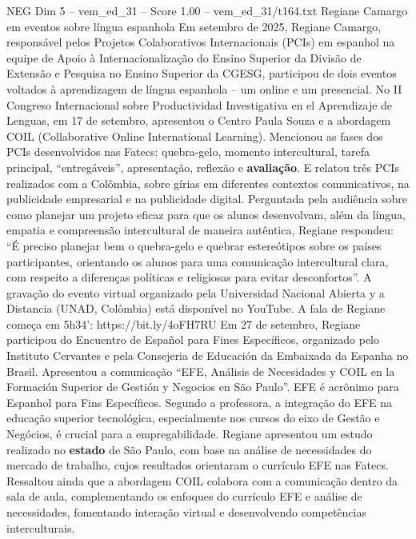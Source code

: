 \begin{textsample}{NEG Dim 5 – vem\_ed\_31 – Score 1.00 – vem\_ed\_31/t164.txt}  \label{ex:f5_neg_120}
Regiane Camargo em eventos sobre língua espanhola Em setembro de 2025, Regiane Camargo, responsável pelos Projetos Colaborativos Internacionais (PCIs) em espanhol na equipe de Apoio à Internacionalização do Ensino Superior da Divisão de Extensão e Pesquisa no Ensino Superior da CGESG, participou de dois eventos voltados à aprendizagem de língua espanhola – um online e um presencial.
No II Congreso Internacional sobre Productividad Investigativa en el Aprendizaje de Lenguas, em 17 de setembro, apresentou o Centro Paula Souza e a abordagem COIL (Collaborative Online International Learning).
Mencionou as fases dos PCIs desenvolvidos nas Fatecs: quebra-gelo, momento intercultural, tarefa principal, “entregáveis”, apresentação, reflexão e \textbf{avaliação}.
E relatou três PCIs realizados com a Colômbia, sobre gírias em diferentes contextos comunicativos, na publicidade empresarial e na publicidade digital.
Perguntada pela audiência sobre como planejar um projeto eficaz para que os alunos desenvolvam, além da língua, empatia e compreensão intercultural de maneira autêntica, Regiane respondeu: “É preciso planejar bem o quebra-gelo e quebrar estereótipos sobre os países participantes, orientando os alunos para uma comunicação intercultural clara, com respeito a diferenças políticas e religiosas para evitar desconfortos”.
A gravação do evento virtual organizado pela Universidad Nacional Abierta y a Distancia (UNAD, Colômbia) está disponível no YouTube.
A fala de Regiane começa em 5h34’: https://bit.ly/4oFH7RU Em 27 de setembro, Regiane participou do Encuentro de Español para Fines Específicos, organizado pelo Instituto Cervantes e pela Consejeria de Educación da Embaixada da Espanha no Brasil.
Apresentou a comunicação “EFE, Análisis de Necesidades y COIL en la Formación Superior de Gestión y Negocios en São Paulo”.
EFE é acrônimo para Espanhol para Fins Específicos.
Segundo a professora, a integração do EFE na educação superior tecnológica, especialmente nos cursos do eixo de Gestão e Negócios, é crucial para a empregabilidade.
Regiane apresentou um estudo realizado no \textbf{estado} de São Paulo, com base na análise de necessidades do mercado de trabalho, cujos resultados orientaram o currículo EFE nas Fatecs.
Ressaltou ainda que a abordagem COIL colabora com a comunicação dentro da sala de aula, complementando os enfoques do currículo EFE e análise de necessidades, fomentando interação virtual e desenvolvendo competências interculturais.

\end{textsample}
